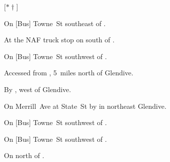 
[$\ast\dagger$]

\begin{LocationList}

On [Bus] Towne~St southeast of .

At the NAF truck stop on  south of  .

On [Bus] Towne~St southwest of .

Accessed from , 5~miles north of Glendive.

By ,
west of Glendive.

On Merrill~Ave at State~St by   in northeast Glendive.

On [Bus] Towne~St southwest of .

On [Bus] Towne~St southwest of .

\Location{\TruckStop \Gas \Rest \Weigh}
On  north of  .

\end{LocationList}
